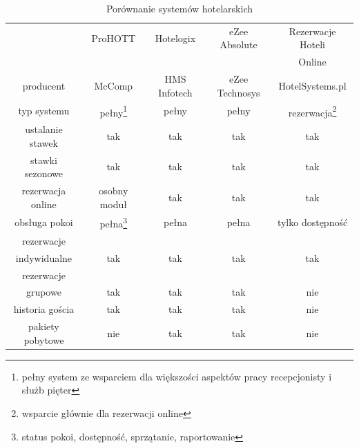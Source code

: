 \documentclass[a4paper,onecolumn,oneside,11pt,wide,floatssmall]{mwrep}
\theoremstyle{definition}
\theoremstyle{plain}%
\theoremstyle{remark}
\begin{document}
\begin{table}[H]
\centering
\caption{Porównanie systemów hotelarskich}
\label{tab:systems}
\begin{minipage}{.9\textwidth}
\setlength{\baselineskip}{2mm}
\centering
\begin{tabular}{c|c|c|c|c}
                  & ProHOTT  & Hotelogix     & eZee Absolute       & Rezerwacje Hoteli \\
                  &&&&                                                         Online  \\ \hline
producent         & McComp   & HMS Infotech  & eZee Technosys      & HotelSystems.pl  \\ \hline
typ systemu       & pełny\footnote{pełny system ze wsparciem dla większości aspektów pracy recepcjonisty i służb pięter}    &  pełny        & pełny               & rezerwacja\footnote{wsparcie głównie dla rezerwacji online}       \\ \hline
ustalanie stawek  & tak      &  tak          & tak                 & tak              \\ \hline
stawki sezonowe   & tak      &  tak          & tak                 & tak              \\ \hline
rezerwacja online & osobny moduł & tak       & tak                 & tak              \\ \hline
obsługa pokoi     & pełna\footnote{status pokoi, dostępność, sprzątanie, raportowanie}    & pełna       & pełna               & tylko dostępność \\ \hline

rezerwacje  &&&&\\
indywidualne      & tak      & tak           & tak                 & tak              \\ \hline
rezerwacje &&&&\\
grupowe           & tak      & tak           & tak                 & nie              \\ \hline
historia gościa   & tak      & tak           & tak                 & nie              \\ \hline  
pakiety pobytowe  & nie      & tak           & tak                 & nie              \\ \hline  


\end{tabular}
\end{minipage}
\end{table}
\end{document}
